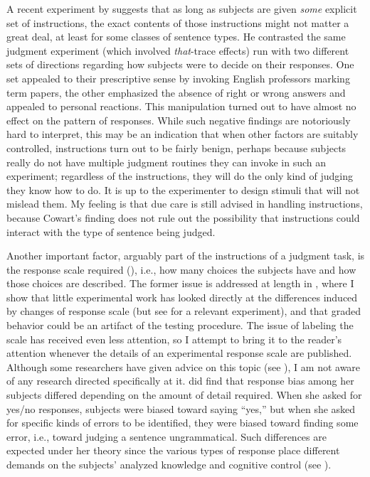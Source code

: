 A recent experiment by \citep[55\textendash{}59]{Cowart1997}
suggests that as long as subjects are given \textit{some} explicit set of instructions, the exact contents of those instructions might not matter a great deal, at least for some classes of sentence types. He contrasted the same judgment experiment (which involved \textit{that}-trace effects) run with two different sets of directions regarding how subjects were to decide on their responses. One set appealed to their prescriptive sense by invoking English professors marking term papers, the other emphasized the absence of right or wrong answers and appealed to personal reactions. This manipulation turned out to have almost no effect on the pattern of responses. While such negative findings are notoriously hard to interpret, this may be an indication that when other factors are suitably controlled, instructions turn out to be fairly benign, perhaps because subjects really do not have multiple judgment routines they can invoke in such an experiment; regardless of the instructions, they will do the only kind of judging they know how to do. It is up to the experimenter to design stimuli that will not mislead them. My feeling is that due care is still advised in handling instructions, because Cowart's finding does not rule out the possibility that instructions could interact with the type of sentence being judged.

Another important factor, arguably part of the instructions of a judgment task, is the response scale required (\citealt{VanKleeck1982}), i.e., how many choices the subjects have and how those choices are described. The former issue is addressed
at length in , where I show that little experimental work has looked directly at the differences induced by changes of response scale (but see \citet[67\textendash{}77]{Cowart1997} for a relevant experiment), and that graded behavior could be an artifact of the testing procedure. The issue of labeling the scale has received even less attention, so I attempt to bring it to the reader's attention whenever the details of an experimental response scale are published. Although some researchers have given advice on this topic (see ), I am not aware of any research directed specifically at it. \citet{Bialystok1979} did find that response bias among her subjects differed depending on the amount of detail required. When she asked for yes/no responses, subjects were biased toward saying ``yes,'' but when she asked for specific kinds of errors to be identified, they were biased toward finding some error, i.e., toward judging a sentence ungrammatical. Such differences are expected under her theory since the various types of response place different demands on the subjects' analyzed knowledge and cognitive control (see ).

